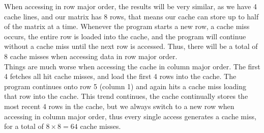 \documentclass[12pt]{jhwhw}
\begin{document}
	\begin{addmargin}[1em]{}
		When accessing in row major order, the results will be very similar, as we have
		4 cache lines, and our matrix has 8 rows, that means our cache can store
		up to half of the matrix at a time. Whenever the program starts a new row,
		a cache miss occurs, the entire row is loaded into the cache, and the program
		will continue without a cache miss until the next row is accessed. Thus,
		there will be a total of 8 cache misses when accessing data in row major order. \\
		\bigbreak
		Things are much worse when accessing the cache in column major order. The first
		4 fetches all hit cache misses, and load the first 4 rows into the cache. The program
		continues onto row 5 (column 1) and again hits a cache miss loading that row into 
		the cache. This trend continues, the cache continually stores the most recent 4
		rows in the cache, but we always switch to a new row when accessing in column major
		order, thus every single access generates a cache miss, for a total of $8\times 8=64$
		cache misses.
	\end{addmargin}
\end{document}
